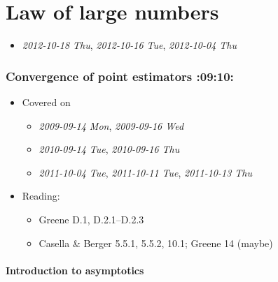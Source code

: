 
\part*{Law of large numbers}%

\begin{itemize}
\item \textit{2012-10-18 Thu}, \textit{2012-10-16 Tue}, \textit{2012-10-04 Thu}
\end{itemize}
\section{Convergence of point estimators \textbf{:09:10:}}
\label{sec-1}

\begin{itemize}
\item Covered on
\begin{itemize}
\item \textit{2009-09-14 Mon}, \textit{2009-09-16 Wed}
\item \textit{2010-09-14 Tue}, \textit{2010-09-16 Thu}
\item \textit{2011-10-04 Tue}, \textit{2011-10-11 Tue}, \textit{2011-10-13 Thu}
\end{itemize}
\item Reading:
\begin{itemize}
\item Greene D.1, D.2.1--D.2.3
\item Casella \& Berger 5.5.1, 5.5.2, 10.1; Greene 14 (maybe)
\end{itemize}
\end{itemize}
\subsection{Introduction to asymptotics}
\label{sec-1-1}


